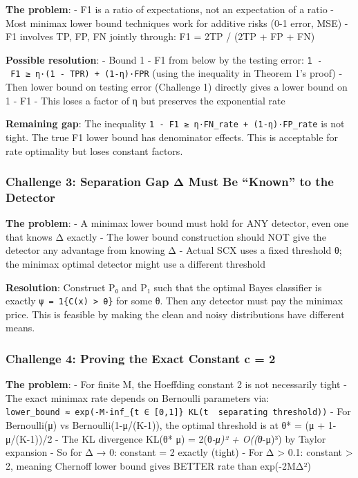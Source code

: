 \documentclass[
  12pt,
]{article}
\begin{document}
\textbf{The problem}: - F1 is a ratio of expectations, not an
expectation of a ratio - Most minimax lower bound techniques work for
additive risks (0-1 error, MSE) - F1 involves TP, FP, FN jointly
through: F1 = 2TP / (2TP + FP + FN)

\textbf{Possible resolution}: - Bound 1 - F1 from below by the testing
error: \texttt{1\ -\ F1\ ≥\ η·(1\ -\ TPR)\ +\ (1-η)·FPR} (using the
inequality in Theorem 1's proof) - Then lower bound on testing error
(Challenge 1) directly gives a lower bound on 1 - F1 - This loses a
factor of η but preserves the exponential rate

\textbf{Remaining gap}: The inequality
\texttt{1\ -\ F1\ ≥\ η·FN\_rate\ +\ (1-η)·FP\_rate} is not tight. The
true F1 lower bound has denominator effects. This is acceptable for rate
optimality but loses constant factors.

\subsubsection{Challenge 3: Separation Gap Δ Must Be ``Known'' to the
Detector}\label{challenge-3-separation-gap-ux3b4-must-be-known-to-the-detector}

\textbf{The problem}: - A minimax lower bound must hold for ANY
detector, even one that knows Δ exactly - The lower bound construction
should NOT give the detector any advantage from knowing Δ - Actual SCX
uses a fixed threshold θ; the minimax optimal detector might use a
different threshold

\textbf{Resolution}: Construct P₀ and P₁ such that the optimal Bayes
classifier is exactly \texttt{ψ\ =\ 1\{C(x)\ \textgreater{}\ θ\}} for
some θ. Then any detector must pay the minimax price. This is feasible
by making the clean and noisy distributions have different means.

\subsubsection{Challenge 4: Proving the Exact Constant c =
2}\label{challenge-4-proving-the-exact-constant-c-2}

\textbf{The problem}: - For finite M, the Hoeffding constant 2 is not
necessarily tight - The exact minimax rate depends on Bernoulli
parameters via:
\texttt{lower\_bound\ ≈\ exp(-M·inf\_\{t\ ∈\ {[}0,1{]}\}\ KL(t\ \textbar{}\textbar{}\ separating\ threshold))}
- For Bernoulli(μ) vs Bernoulli(1-μ/(K-1)), the optimal threshold is at
θ* = (μ + 1-μ/(K-1))/2 - The KL divergence KL(θ* \textbar\textbar{} μ) =
2(θ\emph{-μ)² + O((θ}-μ)³) by Taylor expansion - So for Δ → 0: constant
= 2 exactly (tight) - For Δ \textgreater{} 0.1: constant \textgreater{}
2, meaning Chernoff lower bound gives BETTER rate than exp(-2MΔ²)
\end{document}

